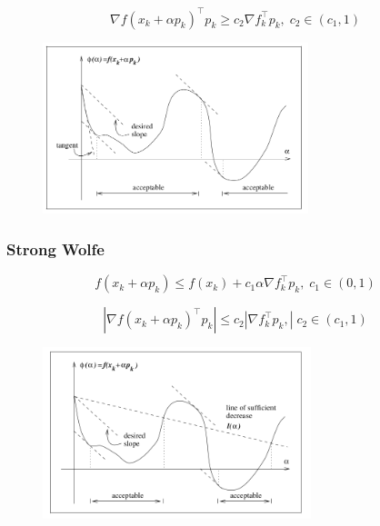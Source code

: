 \begin{frame}
  \begin{equation*}
    \nabla f(x_k + \alpha p_k)^\intercal p_k \geq c_2 \nabla f_{k}^\intercal p_k, \; c_2 \in (c_1, 1)
  \end{equation*}

\begin{figure}
  \includegraphics[height=5cm]{figures/curva.png}
\end{figure}

\end{frame}

\begin{frame}
  \frametitle{Strong Wolfe}
    \begin{equation*}
    f(x_k + \alpha p_k) \leq f(x_k) + c_1 \alpha \nabla f_{k}^\intercal p_k, \; c_1 \in (0,1)
  \end{equation*}

  \begin{equation*}
    \left| \nabla f(x_k + \alpha p_k)^\intercal p_k \right| \leq c_2 \left| \nabla f_{k}^\intercal p_k, \right| \; c_2 \in (c_1, 1)
  \end{equation*}

\begin{figure}
  \includegraphics[height=5cm]{figures/strongWolfe.png}
\end{figure}

\end{frame}
